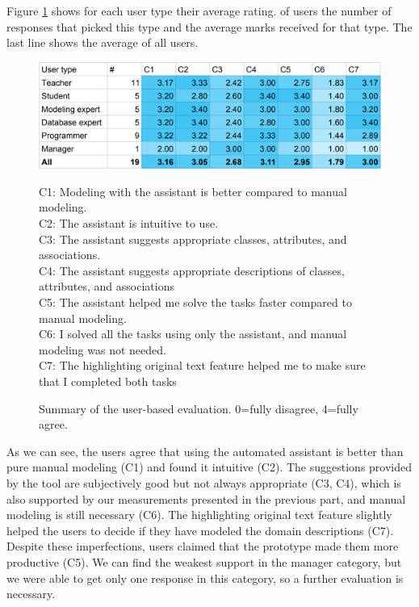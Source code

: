 Figure \ref{fig:user-based-evaluation} shows for each user type their average rating. of users the number of responses that picked this type and the average marks received for that type. The last line shows the average of all users.

\begin{figure}[!h]
    \includegraphics[width=1\linewidth]{img/user-based-evaluation.png} \\
    \scriptsize
\raggedright{C1: Modeling with the assistant is better compared to manual modeling. \\
C2: The assistant is intuitive to use.\\
C3: The assistant suggests appropriate classes, attributes, and associations.\\
C4: The assistant suggests appropriate descriptions of classes, attributes, and associations \\
C5: The assistant helped me solve the tasks faster compared to manual modeling.\\
C6: I solved all the tasks using only the assistant, and manual modeling was not needed. \\
C7: The highlighting original text feature helped me to make sure that I completed both tasks}
    \caption{Summary of the user-based evaluation. 0=fully disagree, 4=fully agree.}
    \label{fig:user-based-evaluation}
\end{figure}

As we can see, the users agree that using the automated assistant is better than pure manual modeling (C1) and found it intuitive (C2).
The suggestions provided by the tool are subjectively good but not always appropriate (C3, C4), which is also supported by our measurements presented in the previous part, and manual modeling is still necessary (C6). The highlighting original text feature slightly helped the users to decide if they have modeled the domain descriptions (C7).
Despite these imperfections, users claimed that the prototype made them more productive (C5).
We can find the weakest support in the manager category, but we were able to get only one response in this category, so a further evaluation is necessary.